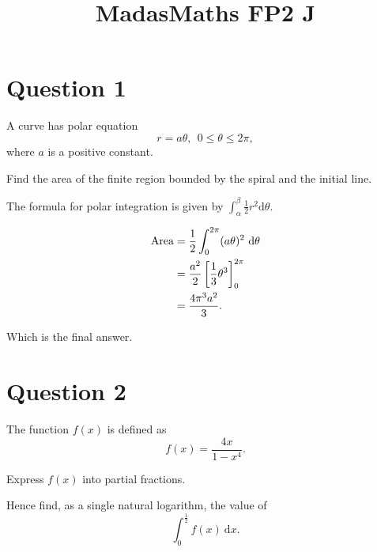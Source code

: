 \documentclass[a4paper, 11pt]{article}
\title{MadasMaths FP2 J}
\begin{document}
    
    \maketitle
    
    \tableofcontents

    \vspace{1.5cm}

    \newpage
    \section{Question 1}

        \begin{tcolorbox}
            \begin{question}
                A curve has polar equation \[ r = a \theta , ~~ 0 \leq \theta \leq 2 \pi, \] where \(a \) is a positive constant. 
    
                \vspace{5pt}
                Find the area of the finite region bounded by the spiral and the initial line. 
            \end{question}
        \end{tcolorbox}

        The formula for polar integration is given by \(\int_{\alpha}^{\beta} \frac{1}{2} r^2 \mathrm{d}\theta\). 

        \begin{align*}
            \text{Area} &= \frac{1}{2} \int_{0}^{2 \pi } (a \theta)^2 ~ \mathrm{d} \theta \\
            &= \frac{a^2}{2} \left[\frac{1}{3} \theta^3 \right]^{2\pi}_0 \\
            &= \frac{4\pi^3 a^2}{3}.
        \end{align*}

        Which is the final answer. 

        
        \section{Question 2}
        \begin{tcolorbox}
            \begin{question}
                The function \(f(x) \) is defined as \[ f(x) = \frac{4x}{1 - x^4}. \]
    
                \begin{questionparts}
                    \item Express \(f(x) \) into partial fractions. 
                    \item Hence find, as a single natural logarithm, the value of \[ \int_{0}^{\frac{1}{2}} f(x)~ \mathrm{d } x. \]
                \end{questionparts}
                
            \end{question}
        \end{tcolorbox}
\end{document}
